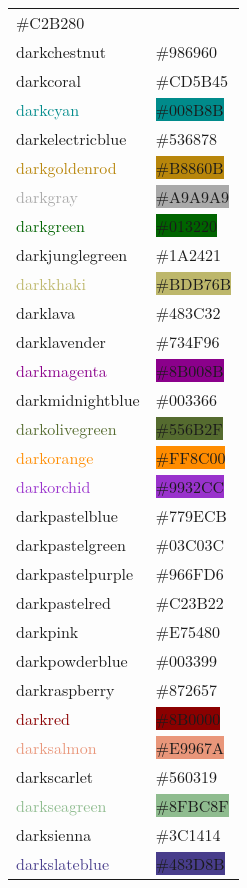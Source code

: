\documentclass[
]{article}
\begin{document}
\begin{longtable}[]{@{}ll@{}}
\colorbox{darkchampagne}{\#C2B280}\tabularnewline
\textcolor{darkchestnut}{darkchestnut} &
\colorbox{darkchestnut}{\#986960}\tabularnewline
\textcolor{darkcoral}{darkcoral} &
\colorbox{darkcoral}{\#CD5B45}\tabularnewline
\textcolor{darkcyan}{darkcyan} &
\colorbox{darkcyan}{\#008B8B}\tabularnewline
\textcolor{darkelectricblue}{darkelectricblue} &
\colorbox{darkelectricblue}{\#536878}\tabularnewline
\textcolor{darkgoldenrod}{darkgoldenrod} &
\colorbox{darkgoldenrod}{\#B8860B}\tabularnewline
\textcolor{darkgray}{darkgray} &
\colorbox{darkgray}{\#A9A9A9}\tabularnewline
\textcolor{darkgreen}{darkgreen} &
\colorbox{darkgreen}{\#013220}\tabularnewline
\textcolor{darkjunglegreen}{darkjunglegreen} &
\colorbox{darkjunglegreen}{\#1A2421}\tabularnewline
\textcolor{darkkhaki}{darkkhaki} &
\colorbox{darkkhaki}{\#BDB76B}\tabularnewline
\textcolor{darklava}{darklava} &
\colorbox{darklava}{\#483C32}\tabularnewline
\textcolor{darklavender}{darklavender} &
\colorbox{darklavender}{\#734F96}\tabularnewline
\textcolor{darkmagenta}{darkmagenta} &
\colorbox{darkmagenta}{\#8B008B}\tabularnewline
\textcolor{darkmidnightblue}{darkmidnightblue} &
\colorbox{darkmidnightblue}{\#003366}\tabularnewline
\textcolor{darkolivegreen}{darkolivegreen} &
\colorbox{darkolivegreen}{\#556B2F}\tabularnewline
\textcolor{darkorange}{darkorange} &
\colorbox{darkorange}{\#FF8C00}\tabularnewline
\textcolor{darkorchid}{darkorchid} &
\colorbox{darkorchid}{\#9932CC}\tabularnewline
\textcolor{darkpastelblue}{darkpastelblue} &
\colorbox{darkpastelblue}{\#779ECB}\tabularnewline
\textcolor{darkpastelgreen}{darkpastelgreen} &
\colorbox{darkpastelgreen}{\#03C03C}\tabularnewline
\textcolor{darkpastelpurple}{darkpastelpurple} &
\colorbox{darkpastelpurple}{\#966FD6}\tabularnewline
\textcolor{darkpastelred}{darkpastelred} &
\colorbox{darkpastelred}{\#C23B22}\tabularnewline
\textcolor{darkpink}{darkpink} &
\colorbox{darkpink}{\#E75480}\tabularnewline
\textcolor{darkpowderblue}{darkpowderblue} &
\colorbox{darkpowderblue}{\#003399}\tabularnewline
\textcolor{darkraspberry}{darkraspberry} &
\colorbox{darkraspberry}{\#872657}\tabularnewline
\textcolor{darkred}{darkred} &
\colorbox{darkred}{\#8B0000}\tabularnewline
\textcolor{darksalmon}{darksalmon} &
\colorbox{darksalmon}{\#E9967A}\tabularnewline
\textcolor{darkscarlet}{darkscarlet} &
\colorbox{darkscarlet}{\#560319}\tabularnewline
\textcolor{darkseagreen}{darkseagreen} &
\colorbox{darkseagreen}{\#8FBC8F}\tabularnewline
\textcolor{darksienna}{darksienna} &
\colorbox{darksienna}{\#3C1414}\tabularnewline
\textcolor{darkslateblue}{darkslateblue} &
\colorbox{darkslateblue}{\#483D8B}\tabularnewline

\end{longtable}
\end{document}
